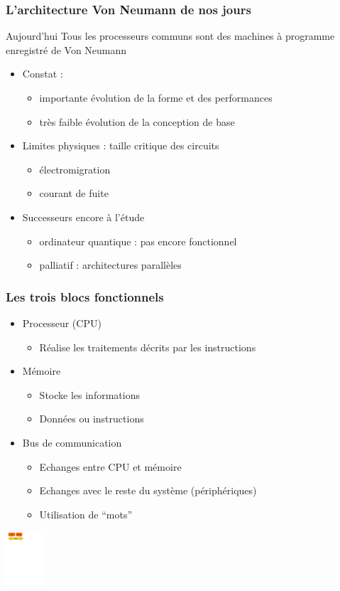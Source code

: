 \begin{frame}
\frametitle{L'architecture Von Neumann de nos jours}
\begin{block}{Aujourd'hui}
Tous les processeurs communs sont des machines à programme enregistré de Von Neumann
\end{block}

\begin{itemize}
\item <1-> Constat :
\begin{itemize}
\item importante évolution de la forme et des performances
\item très faible évolution de la conception de base
\end{itemize}
\item <2-> Limites physiques : taille critique des circuits
\begin{itemize}
\item électromigration
\item courant de fuite
\end{itemize}
\item <3-> Successeurs encore à l'étude
\begin{itemize}
\item ordinateur quantique : pas encore fonctionnel
\item palliatif : architectures parallèles
\end{itemize}
\end{itemize}
\end{frame}


\begin{frame}
\frametitle{Les trois blocs fonctionnels}
\begin{itemize}
\item Processeur (CPU)
\begin{itemize}
\item Réalise les traitements décrits par les instructions
\end{itemize}
\item Mémoire
\begin{itemize}
\item Stocke les informations
\item Données ou instructions
\end{itemize}
\item Bus de communication
\begin{itemize}
\item Echanges entre CPU et mémoire
\item Echanges avec le reste du système (périphériques)
\item Utilisation de “mots”
\end{itemize}
\end{itemize}
\includegraphics[height=2cm]{../illustration/vn_cpu_mem_bus.pdf}
\end{frame}


